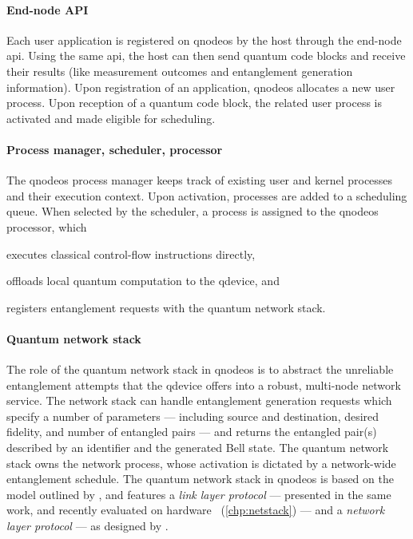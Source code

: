 \paragraph{End-node API}

Each user application is registered on \acrshort{qnodeos} by the host through the end-node
\acrshort{api}. Using the same \acrshort{api}, the host can then send quantum code blocks and
receive their results (like measurement outcomes and entanglement generation information). Upon
registration of an application, \acrshort{qnodeos} allocates a new user process. Upon reception of a
quantum code block, the related user process is activated and made eligible for scheduling.

\paragraph{Process manager, scheduler, processor}

The \acrshort{qnodeos} process manager keeps track of existing user and kernel processes and their
execution context. Upon activation, processes are added to a scheduling queue. When selected by the
scheduler, a process is assigned to the \acrshort{qnodeos} processor, which
%
\begin{inlinelist}
    \item executes classical control-flow instructions directly,
    \item offloads local quantum computation to the \acrshort{qdevice}, and
    \item registers entanglement requests with the quantum network stack.
\end{inlinelist}

\paragraph{Quantum network stack}

The role of the quantum network stack in \acrshort{qnodeos} is to abstract the unreliable
entanglement attempts that the \acrshort{qdevice} offers into a robust, multi-node network service.
The network stack can handle entanglement generation requests which specify a number of parameters
--- including source and destination, desired fidelity, and number of entangled pairs --- and
returns the entangled pair(s) described by an identifier and the generated Bell state. The quantum
network stack owns the network process, whose activation is dictated by a network-wide entanglement
schedule. The quantum network stack in \acrshort{qnodeos} is based on the model outlined by
\textcite{dahlberg_2019_egp}, and features a \emph{link layer protocol} --- presented in the same
work, and recently evaluated on hardware~\cite{pompili_2022_experimental} (\cref{chp:netstack}) ---
and a \emph{network layer protocol} --- as designed by \textcite{kozlowski_2020_qnp}.

